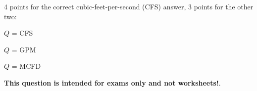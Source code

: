 4 points for the correct cubic-feet-per-second (CFS) answer, 3 points for the other two:

\vskip 10pt

$Q$ =  CFS

\vskip 10pt

$Q$ =  GPM

\vskip 10pt

$Q$ =  MCFD








{\bf This question is intended for exams only and not worksheets!}.




